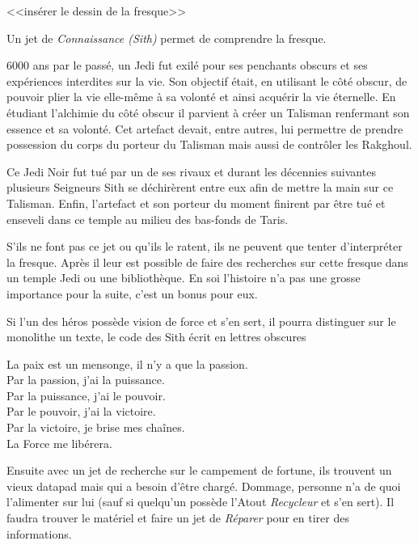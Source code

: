 <<insérer le dessin de la fresque>>

Un jet de \emph{Connaissance (Sith)} permet de comprendre la fresque. 

\begin{quotebox}
6000 ans par le passé, un Jedi fut exilé pour ses penchants obscurs et ses expériences interdites sur la vie. Son objectif était, en utilisant le côté obscur, de pouvoir plier la vie elle-même à sa volonté et ainsi acquérir la vie éternelle. En étudiant l’alchimie du côté obscur il parvient à créer un Talisman renfermant son essence et sa volonté. Cet artefact devait, entre autres, lui permettre de prendre possession du corps du porteur du Talisman mais aussi de contrôler les Rakghoul.

Ce Jedi Noir fut tué par un de ses rivaux et durant les décennies suivantes plusieurs Seigneurs Sith se déchirèrent entre eux afin de mettre la main sur ce Talisman. Enfin, l’artefact et son porteur du moment finirent par être tué et enseveli dans ce temple au milieu des bas-fonds de Taris.
\end{quotebox}

S’ils ne font pas ce jet ou qu’ils le ratent, ils ne peuvent que tenter d’interpréter la fresque. Après il leur est possible de faire des recherches sur cette fresque dans un temple Jedi ou une bibliothèque. En soi l’histoire n’a pas une grosse importance pour la suite, c’est un bonus pour eux.

Si l’un des héros possède vision de force et s’en sert, il pourra distinguer sur le monolithe un texte, le code des Sith écrit en lettres obscures
\begin{quotebox}
La paix est un mensonge, il n’y a que la passion. \\
Par la passion, j’ai la puissance. \\
Par la puissance, j’ai le pouvoir. \\
Par le pouvoir, j’ai la victoire. \\
Par la victoire, je brise mes chaînes. \\
La Force me libérera.
\end{quotebox}

Ensuite avec un jet de recherche sur le campement de fortune, ils trouvent un vieux datapad mais qui a besoin d’être chargé. Dommage, personne n’a de quoi l’alimenter sur lui (sauf si quelqu’un possède l’Atout \emph{Recycleur} et s’en sert). Il faudra trouver le matériel et faire un jet de \emph{Réparer} pour en tirer des informations.

